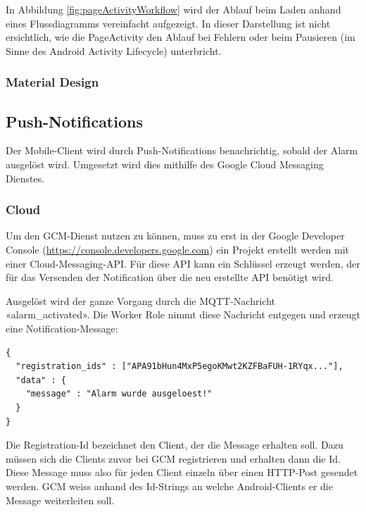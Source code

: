 In Abbildung \ref{fig:pageActivityWorkflow} wird der Ablauf beim Laden anhand eines Flussdiagramms vereinfacht aufgezeigt. In dieser Darstellung ist nicht ersichtlich, wie die PageActivity den Ablauf bei Fehlern oder beim Pausieren (im Sinne des Android Activity Lifecycle) unterbricht.

\subsubsection{Material Design}

\subsection{Push-Notifications}
\label{sec:notificationRealization}
Der Mobile-Client wird durch Push-Notifications benachrichtig, sobald der Alarm ausgelöst wird. Umgesetzt wird dies mithilfe des Google Cloud Messaging Dienstes.

\subsubsection{Cloud}
Um den GCM-Dienst nutzen zu können, muss zu erst in der Google Developer Console (\url{https://console.developers.google.com}) ein Projekt erstellt werden mit einer Cloud-Messaging-API. Für diese API kann ein Schlüssel erzeugt werden, der für das Versenden der Notification über die neu erstellte API benötigt wird.

Ausgelöst wird der ganze Vorgang durch die MQTT-Nachricht «alarm\_activated». Die Worker Role nimmt diese Nachricht entgegen und erzeugt eine Notification-Message:

\begin{lstlisting}[style=csharp, caption=Notification.cs - Notification Message]
{
  "registration_ids" : ["APA91bHun4MxP5egoKMwt2KZFBaFUH-1RYqx..."],
  "data" : {
  	"message" : "Alarm wurde ausgeloest!"
  }
}
\end{lstlisting}

Die Registration-Id bezeichnet den Client, der die Message erhalten soll. Dazu müssen sich die Clients zuvor bei GCM registrieren und erhalten dann die Id. Diese Message muss also für jeden Client einzeln über einen HTTP-Post gesendet werden. GCM weiss anhand des Id-Strings an welche Android-Clients er die Message weiterleiten soll.

